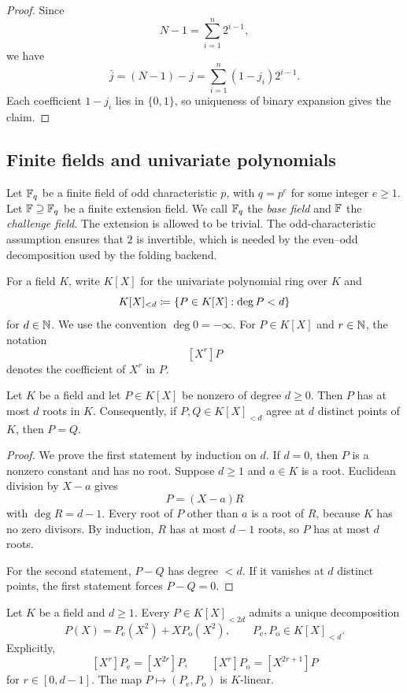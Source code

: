 \begin{proof}
Since
\[
  N-1=\sum_{i=1}^{n}2^{i-1},
\]
we have
\[
  \bar j=(N-1)-j
  =\sum_{i=1}^{n}(1-j_i)2^{i-1}.
\]
Each coefficient $1-j_i$ lies in $\{0,1\}$, so uniqueness of binary expansion gives the claim.
\end{proof}

\subsection{Finite fields and univariate polynomials}
\label{sec:preliminaries-fields}

Let $\mathbb{F}_q$ be a finite field of odd characteristic $p$, with $q=p^e$ for some integer $e\ge1$.  Let $\mathbb{F}\supseteq\mathbb{F}_q$ be a finite extension field.  We call $\mathbb{F}_q$ the \emph{base field} and $\mathbb{F}$ the \emph{challenge field}.  The extension is allowed to be trivial.  The odd-characteristic assumption ensures that $2$ is invertible, which is needed by the even--odd decomposition used by the folding backend.

For a field $K$, write $K[X]$ for the univariate polynomial ring over $K$ and
\[
  K[X]_{<d}\coloneqq\{P\in K[X]:\deg P<d\}
\]
for $d\in\mathbb{N}$.  We use the convention $\deg0=-\infty$.  For $P\in K[X]$ and $r\in\mathbb{N}$, the notation
\[
  [X^r]P
\]
denotes the coefficient of $X^r$ in $P$.

\begin{lemma}
\label{lem:root-bound}
Let $K$ be a field and let $P\in K[X]$ be nonzero of degree $d\ge0$.  Then $P$ has at most $d$ roots in $K$.  Consequently, if $P,Q\in K[X]_{<d}$ agree at $d$ distinct points of $K$, then $P=Q$.
\end{lemma}

\begin{proof}
We prove the first statement by induction on $d$.  If $d=0$, then $P$ is a nonzero constant and has no root.  Suppose $d\ge1$ and $a\in K$ is a root.  Euclidean division by $X-a$ gives
\[
  P=(X-a)R
\]
with $\deg R=d-1$.  Every root of $P$ other than $a$ is a root of $R$, because $K$ has no zero divisors.  By induction, $R$ has at most $d-1$ roots, so $P$ has at most $d$ roots.

For the second statement, $P-Q$ has degree $<d$.  If it vanishes at $d$ distinct points, the first statement forces $P-Q=0$.
\end{proof}

\begin{lemma}
\label{lem:evenodd-polynomial}
Let $K$ be a field and $d\ge1$.  Every $P\in K[X]_{<2d}$ admits a unique decomposition
\begin{equation}
  P(X)=P_{\mathrm e}(X^2)+XP_{\mathrm o}(X^2),
  \qquad
  P_{\mathrm e},P_{\mathrm o}\in K[X]_{<d}.
  \label{eq:evenodd-polynomial}
\end{equation}
Explicitly,
\[
  [X^r]P_{\mathrm e}=[X^{2r}]P,
  \qquad
  [X^r]P_{\mathrm o}=[X^{2r+1}]P
\]
for $r\in[0,d-1]$.  The map $P\mapsto(P_{\mathrm e},P_{\mathrm o})$ is $K$-linear.
\end{lemma}

